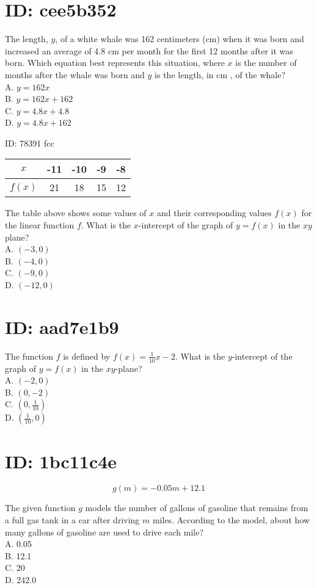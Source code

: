 \section*{ID: cee5b352}
The length, $y$, of a white whale was 162 centimeters (cm) when it was born and increased an average of 4.8 cm per month for the first 12 months after it was born. Which equation best represents this situation, where $x$ is the number of months after the whale was born and $y$ is the length, in cm , of the whale?\\
A. $y=162 x$\\
B. $y=162 x+162$\\
C. $y=4.8 x+4.8$\\
D. $y=4.8 x+162$

ID: 78391 fcc

\begin{center}
\begin{tabular}{|c|c|c|c|c|}
\hline
$x$ & -11 & -10 & -9 & -8 \\
\hline
$f(x)$ & 21 & 18 & 15 & 12 \\
\hline
\end{tabular}
\end{center}

The table above shows some values of $x$ and their corresponding values $f(x)$ for the linear function $f$. What is the $x$-intercept of the graph of $y=f(x)$ in the $x y$ plane?\\
A. $(-3,0)$\\
B. $(-4,0)$\\
C. $(-9,0)$\\
D. $(-12,0)$

\section*{ID: aad7e1b9}
The function $f$ is defined by $f(x)=\frac{1}{10} x-2$. What is the $y$-intercept of the graph of $y=f(x)$ in the $x y$-plane?\\
A. $(-2,0)$\\
B. $(0,-2)$\\
C. $\left(0, \frac{1}{10}\right)$\\
D. $\left(\frac{1}{10}, 0\right)$

\section*{ID: 1bc11c4e}
$$
g(m)=-0.05 m+12.1
$$

The given function $g$ models the number of gallons of gasoline that remains from a full gas tank in a car after driving $m$ miles. According to the model, about how many gallons of gasoline are used to drive each mile?\\
A. 0.05\\
B. 12.1\\
C. 20\\
D. 242.0

